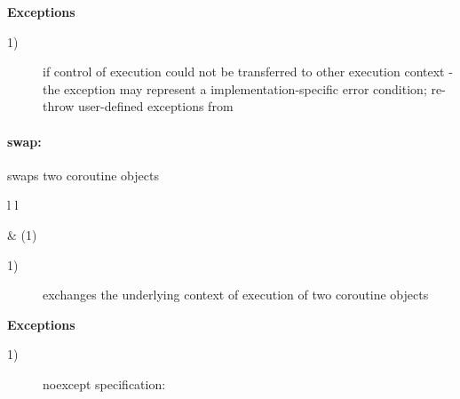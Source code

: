 {\bf Exceptions}
\begin{description}
    \item[1)]  if control of execution could not be
              transferred to other execution context - the exception may
              represent a implementation-specific error condition; re-throw
              user-defined exceptions from \corofunction
\end{description}

\paragraph*{swap:}
swaps two coroutine objects\\

\begin{tabular}{ l l }
    \midrule

     & (1)\\

    \midrule
\end{tabular}

\begin{description}
    \item[1)] exchanges the underlying context of execution of two coroutine objects
\end{description}

{\bf Exceptions}
\begin{description}
    \item[1)] noexcept specification: 
\end{description}
